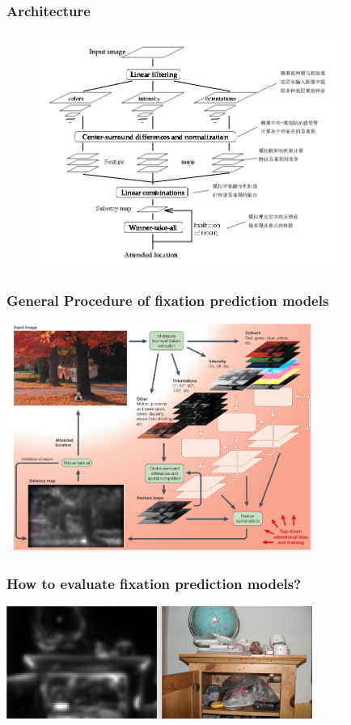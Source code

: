 \documentclass[notheorems,serif,table,compress]{beamer}  %
\begin{document}
\begin{frame}
\frametitle{Architecture}
\begin{figure}
\includegraphics[width=10cm]{ITTImodel.png}
\end{figure}
\end{frame}


\begin{frame}
\frametitle{General Procedure of fixation prediction models}
\centering\includegraphics[width=10cm]{fixationArchitecture}
\end{frame}


\begin{frame}
\frametitle{How to evaluate fixation prediction models?}
\centering\includegraphics[width=10cm]{evaluateFixationModel}
\end{frame}
\end{document}
